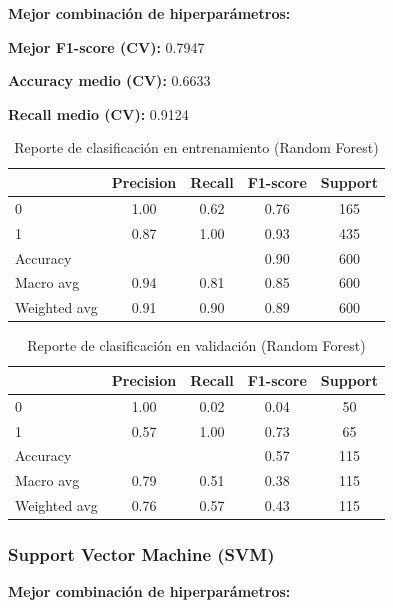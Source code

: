 \documentclass[conference]{IEEEtran}
\begin{document}
\textbf{Mejor combinación de hiperparámetros:} 



\textbf{Mejor F1-score (CV):} 0.7947 

\textbf{Accuracy medio (CV):} 0.6633 

\textbf{Recall medio (CV):} 0.9124

\begin{table}[htbp]
\centering
\caption{Reporte de clasificación en entrenamiento (Random Forest)}
\begin{tabular}{lcccc}
\toprule
 & Precision & Recall & F1-score & Support \\
\midrule
0 & 1.00 & 0.62 & 0.76 & 165 \\
1 & 0.87 & 1.00 & 0.93 & 435 \\
\midrule
Accuracy & & & 0.90 & 600 \\
Macro avg & 0.94 & 0.81 & 0.85 & 600 \\
Weighted avg & 0.91 & 0.90 & 0.89 & 600 \\
\bottomrule
\end{tabular}
\label{tab:rf_train}
\end{table}

\begin{table}[htbp]
\centering
\caption{Reporte de clasificación en validación (Random Forest)}
\begin{tabular}{lcccc}
\toprule
 & Precision & Recall & F1-score & Support \\
\midrule
0 & 1.00 & 0.02 & 0.04 & 50 \\
1 & 0.57 & 1.00 & 0.73 & 65 \\
\midrule
Accuracy & & & 0.57 & 115 \\
Macro avg & 0.79 & 0.51 & 0.38 & 115 \\
Weighted avg & 0.76 & 0.57 & 0.43 & 115 \\
\bottomrule
\end{tabular}
\label{tab:rf_val}
\end{table}


\subsubsection{Support Vector Machine (SVM)}

\textbf{Mejor combinación de hiperparámetros:} 
\end{document}
